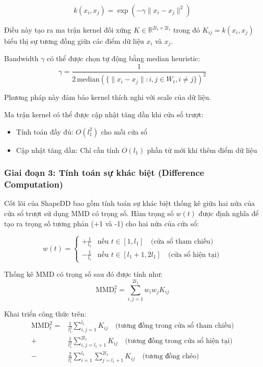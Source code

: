 \begin{equation}
	k(x_i, x_j) = \exp\left(-\gamma \|x_i - x_j\|^2\right)
\end{equation}

Điều này tạo ra ma trận kernel đối xứng $K \in \mathbb{R}^{2l_1 \times 2l_1}$ trong đó $K_{ij} = k(x_i, x_j)$ biểu thị sự tương đồng giữa các điểm dữ liệu $x_i$ và $x_j$.

Bandwidth $\gamma$ có thể được chọn tự động bằng median heuristic:
\begin{equation}
	\gamma = \frac{1}{2\,\text{median}\left(\{\|x_i - x_j\| : i, j \in W_t, i \neq j\}\right)^2}
\end{equation}

Phương pháp này đảm bảo kernel thích nghi với scale của dữ liệu.

Ma trận kernel có thể được cập nhật tăng dần khi cửa sổ trượt:
\begin{itemize}
	\item Tính toán đầy đủ: $O(l_1^2)$ cho mỗi cửa sổ
	\item Cập nhật tăng dần: Chỉ cần tính $O(l_1)$ phần tử mới khi thêm điểm dữ liệu
\end{itemize}

\subsubsection{Giai đoạn 3: Tính toán sự khác biệt (Difference Computation)}

Cốt lõi của ShapeDD bao gồm tính toán sự khác biệt thống kê giữa hai nửa của cửa sổ trượt sử dụng MMD có trọng số. Hàm trọng số $w(t)$ được định nghĩa để tạo ra trọng số tương phản (+1 và -1) cho hai nửa của cửa sổ:

\begin{equation}
	w(t) = \begin{cases}
		+\frac{1}{l_1} & \text{nếu } t \in [1, l_1] \quad \text{(cửa sổ tham chiếu)}    \\
		-\frac{1}{l_1} & \text{nếu } t \in [l_1+1, 2l_1] \quad \text{(cửa sổ hiện tại)}
	\end{cases}
\end{equation}

Thống kê MMD có trọng số sau đó được tính như:
\begin{equation}
	\text{MMD}^2_t = \sum_{i,j=1}^{2l_1} w_i w_j K_{ij}
\end{equation}

Khai triển công thức trên:
\begin{align}
	\text{MMD}^2_t = & \frac{1}{l_1^2} \sum_{i,j=1}^{l_1} K_{ij} \quad \text{(tương đồng trong cửa sổ tham chiếu)} \nonumber    \\
	+                & \frac{1}{l_1^2} \sum_{i,j=l_1+1}^{2l_1} K_{ij} \quad \text{(tương đồng trong cửa sổ hiện tại)} \nonumber \\
	-                & \frac{2}{l_1^2} \sum_{i=1}^{l_1} \sum_{j=l_1+1}^{2l_1} K_{ij} \quad \text{(tương đồng chéo)}
\end{align}

